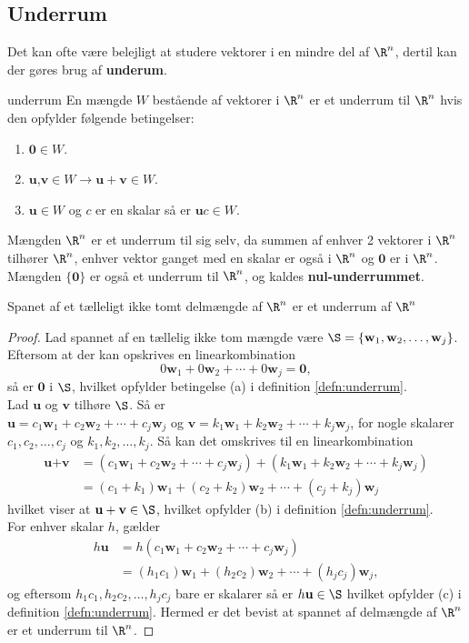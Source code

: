 \subsection{Underrum}
Det kan ofte være belejligt at studere vektorer i en mindre del af $\R^n$, dertil kan der gøres brug af \textbf{underum}.
\begin{defn}{}{underrum}
En mængde $W$ bestående af vektorer i $\R^n$ er et underrum til $\R^n$ hvis den opfylder følgende betingelser:	
\begin{enumerate}[label=(\alph*)]
	\item  $\textbf{0}\in W$.
	\item $\textbf{u}$,$\textbf{v} \in W \rightarrow \textbf{u}+\textbf{v} \in W $.
	\item $\textbf{u} \in W$ og $c$ er en skalar så er $\textbf{u}c \in W$.
\end{enumerate}
\end{defn}
\noindent
Mængden $\R^n$ er et underrum til sig selv, da summen af enhver 2 vektorer i $\R^n$ tilhører $\R^n$, enhver vektor ganget med en skalar er også i $\R^n$ og $\textbf{0}$ er i $\R^n$. Mængden $\{\textbf{0}\}$ er også et underrum til $\R^n$, og kaldes \textbf{nul-underrummet}.


\begin{thm}{}{}
Spanet af et tælleligt ikke tomt delmængde af $\R^n$ er et underrum af $\R^n$
\end{thm}
\begin{proof}
Lad spannet af en tællelig ikke tom mængde være 
$\S=\{\textbf{w}_1 , \textbf{w}_2 , \ldots , \textbf{w}_j\}$.
Eftersom at der kan opskrives en linearkombination $$0\textbf{w}_1 + 0\textbf{w}_2 + \cdots + 0\textbf{w}_j=\textbf{0},$$ så er $\textbf{0}$ i  $\S$, hvilket opfylder betingelse (a) i definition \ref{defn:underrum}.\\
Lad $\textbf{u}$ og $\textbf{v}$ tilhøre $\S$. Så er\\
$\textbf{u}=c_1\textbf{w}_1+c_2\textbf{w}_2+\cdots+c_j\textbf{w}_j$ og $\textbf{v}=k_1\textbf{w}_1+k_2\textbf{w}_2+\cdots+k_j\textbf{w}_j$, for nogle skalarer $c_1,c_2,\ldots,c_j$ og $k_1,k_2,\ldots,k_j$. Så kan det omskrives til en linearkombination
\begin{align*}
\textbf{u}+\textbf{v}&=(c_1\textbf{w}_1+c_2\textbf{w}_2+\cdots+c_j\textbf{w}_j)+(k_1\textbf{w}_1+k_2\textbf{w}_2+\cdots+k_j\textbf{w}_j)\\
&=(c_1+k_1)\textbf{w}_1+(c_2+k_2)\textbf{w}_2+\cdots+(c_j+k_j)\textbf{w}_j
\end{align*}
hvilket viser at $\textbf{u}+\textbf{v}\in \S$, hvilket opfylder (b) i definition \ref{defn:underrum}.\\
For enhver skalar $h$, gælder
\begin{align*}
h\textbf{u}&=h(c_1\textbf{w}_1+c_2\textbf{w}_2+\cdots+c_j\textbf{w}_j)\\
&=(h_1c_1)\textbf{w}_1+(h_2c_2)\textbf{w}_2+\cdots+(h_jc_j)\textbf{w}_j,
\end{align*}
og eftersom $h_1c_1,h_2c_2,\ldots,h_jc_j$ bare er skalarer så er $h\textbf{u}\in \S$ hvilket opfylder (c) i definition \ref{defn:underrum}.
Hermed er det bevist at spannet af delmængde af $\R^n$ er et underrum til $\R^n$.
\end{proof}


